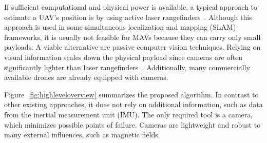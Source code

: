 If sufficient computational and physical power is available, a typical
approach to estimate a UAV's position is by using active laser
rangefinders~\cite{grzonka2009towards,bachrach2009autonomous}.
Although this approach is used in some simultaneous localization and
mapping (SLAM) frameworks, it is usually not feasible for MAVs because
they can carry only small payloads. A viable alternative are passive
computer vision techniques. Relying on visual information scales down
the physical payload since cameras are often significantly lighter
than laser
rangefinders~\cite{blosch2010vision,angeli20062d,ahrens2009vision}.
Additionally, many commercially available drones are already equipped
with cameras.

Figure~\ref{fig:highleveloverview} summarizes the proposed algorithm. In contrast to other existing approaches, it does not rely on additional information, such as data from the inertial measurement unit (IMU). The only required tool is a camera, which minimizes possible points of failure. Cameras are lightweight and robust to many external influences, such as magnetic fields. 